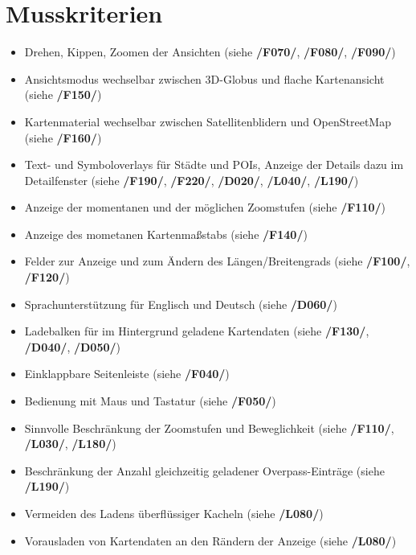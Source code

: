 \documentclass[10pt]{scrreprt}
\begin{document}
\section{Musskriterien}
\begin{itemize}
\item Drehen, Kippen, Zoomen der Ansichten (siehe \textbf{/F070/}, \textbf{/F080/}, \textbf{/F090/})
\item Ansichtsmodus wechselbar zwischen 3D-Globus und flache Kartenansicht (siehe \textbf{/F150/})
\item Kartenmaterial wechselbar zwischen Satellitenblidern und OpenStreetMap (siehe \textbf{/F160/})
\item Text- und Symboloverlays für Städte und POIs, Anzeige der Details dazu im Detailfenster (siehe \textbf{/F190/}, \textbf{/F220/}, \textbf{/D020/}, \textbf{/L040/}, \textbf{/L190/})
\item Anzeige der momentanen und der möglichen Zoomstufen (siehe \textbf{/F110/})
\item Anzeige des mometanen Kartenmaßstabs  (siehe \textbf{/F140/})
\item Felder zur Anzeige und zum Ändern des Längen/Breitengrads (siehe \textbf{/F100/}, \textbf{/F120/})
\item Sprachunterstützung für Englisch und Deutsch (siehe \textbf{/D060/})
\item Ladebalken für im Hintergrund geladene Kartendaten (siehe \textbf{/F130/}, \textbf{/D040/}, \textbf{/D050/})
\item Einklappbare Seitenleiste (siehe \textbf{/F040/})
\item Bedienung mit Maus und Tastatur (siehe \textbf{/F050/})
\item Sinnvolle Beschränkung der Zoomstufen und Beweglichkeit (siehe \textbf{/F110/}, \textbf{/L030/}, \textbf{/L180/})
\item Beschränkung der Anzahl gleichzeitig geladener Overpass-Einträge (siehe \textbf{/L190/})
\item Vermeiden des Ladens überflüssiger Kacheln (siehe \textbf{/L080/})
\item Vorausladen von Kartendaten an den Rändern der Anzeige (siehe \textbf{/L080/})
\end{itemize}
\end{document}
